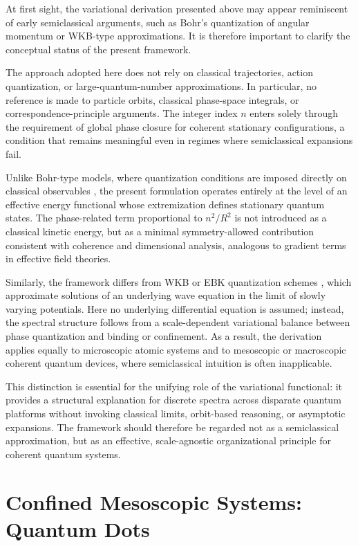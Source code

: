 \documentclass[11pt]{article}
\begin{document}
            At first sight, the variational derivation presented above may appear reminiscent of early semiclassical arguments, such as Bohr's quantization of angular momentum or WKB-type approximations. It is therefore important to clarify the conceptual status of the present framework.

            The approach adopted here does not rely on classical trajectories, action quantization, or large-quantum-number approximations. In particular, no reference is made to particle orbits, classical phase-space integrals, or correspondence-principle arguments. The integer index $n$ enters solely through the requirement of global phase closure for coherent stationary configurations, a condition that remains meaningful even in regimes where semiclassical expansions fail.

            Unlike Bohr-type models, where quantization conditions are imposed directly on classical observables \cite{Bohr1913}, the present formulation operates entirely at the level of an effective energy functional whose extremization defines stationary quantum states. The phase-related term proportional to $n^2/R^2$ is not introduced as a classical kinetic energy, but as a minimal symmetry-allowed contribution consistent with coherence and dimensional analysis, analogous to gradient terms in effective field theories.

            Similarly, the framework differs from WKB or EBK quantization schemes \cite{MaslovFedoriuk1981}, which approximate solutions of an underlying wave equation in the limit of slowly varying potentials. Here no underlying differential equation is assumed; instead, the spectral structure follows from a scale-dependent variational balance between phase quantization and binding or confinement. As a result, the derivation applies equally to microscopic atomic systems and to mesoscopic or macroscopic coherent quantum devices, where semiclassical intuition is often inapplicable.

            This distinction is essential for the unifying role of the variational functional: it provides a structural explanation for discrete spectra across disparate quantum platforms without invoking classical limits, orbit-based reasoning, or asymptotic expansions. The framework should therefore be regarded not as a semiclassical approximation, but as an effective, scale-agnostic organizational principle for coherent quantum systems.

    \section{Confined Mesoscopic Systems: Quantum Dots}
\end{document}
